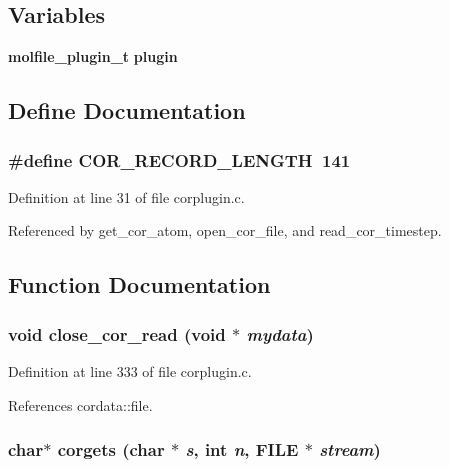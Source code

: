 \subsection*{Variables}
\begin{CompactItemize}
\item 
{\bf molfile\_\-plugin\_\-t} {\bf plugin}
\end{CompactItemize}


\subsection{Define Documentation}
\subsubsection{\setlength{\rightskip}{0pt plus 5cm}\#define COR\_\-RECORD\_\-LENGTH\ 141}\label{corplugin_8c_a0}




Definition at line 31 of file corplugin.c.

Referenced by get\_\-cor\_\-atom, open\_\-cor\_\-file, and read\_\-cor\_\-timestep.

\subsection{Function Documentation}
\subsubsection{\setlength{\rightskip}{0pt plus 5cm}void close\_\-cor\_\-read (void $\ast$ {\em mydata})\hspace{0.3cm}{\tt  [static]}}\label{corplugin_8c_a9}




Definition at line 333 of file corplugin.c.

References cordata::file.
\subsubsection{\setlength{\rightskip}{0pt plus 5cm}char$\ast$ corgets (char $\ast$ {\em s}, int {\em n}, FILE $\ast$ {\em stream})\hspace{0.3cm}{\tt  [static]}}\label{corplugin_8c_a3}




